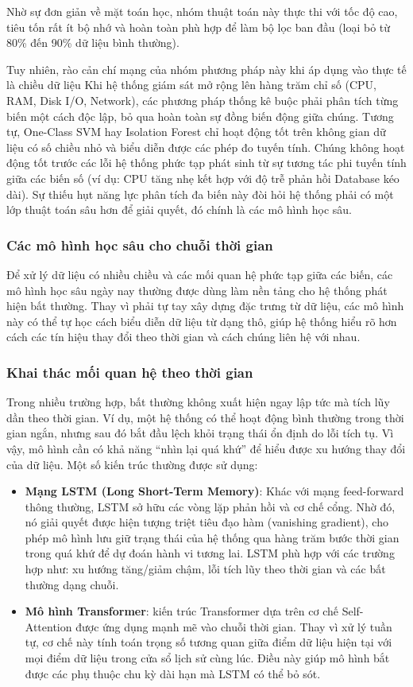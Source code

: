 Nhờ sự đơn giản về mặt toán học, nhóm thuật toán này thực thi với tốc độ cao, tiêu tốn rất ít bộ nhớ và hoàn toàn phù hợp để làm bộ lọc ban đầu (loại bỏ từ 80\% đến 90\% dữ liệu bình thường).

Tuy nhiên, rào cản chí mạng của nhóm phương pháp này khi áp dụng vào thực tế là chiều dữ liệu  Khi hệ thống giám sát mở rộng lên hàng trăm chỉ số (CPU, RAM, Disk I/O, Network), các phương pháp thống kê buộc phải phân tích từng biến một cách độc lập, bỏ qua hoàn toàn sự đồng biến động giữa chúng. Tương tự, One-Class SVM hay Isolation Forest chỉ hoạt động tốt trên không gian dữ liệu có số chiều nhỏ và biểu diễn được các phép đo tuyến tính. Chúng không hoạt động tốt trước các lỗi hệ thống phức tạp phát sinh từ sự tương tác phi tuyến tính giữa các biến số (ví dụ: CPU tăng nhẹ kết hợp với độ trễ phản hồi Database kéo dài). Sự thiếu hụt năng lực phân tích đa biến này đòi hỏi hệ thống phải có một lớp thuật toán sâu hơn để giải quyết, đó chính là các mô hình học sâu.

\subsubsection{Các mô hình học sâu cho chuỗi thời gian}
Để xử lý dữ liệu có nhiều chiều và các mối quan hệ phức tạp giữa các biến, các mô hình học sâu ngày nay thường được dùng làm nền tảng cho hệ thống phát hiện bất thường. Thay vì phải tự tay xây dựng đặc trưng từ dữ liệu, các mô hình này có thể tự học cách biểu diễn dữ liệu từ dạng thô, giúp hệ thống hiểu rõ hơn cách các tín hiệu thay đổi theo thời gian và cách chúng liên hệ với nhau.
\subsubsection*{Khai thác mối quan hệ theo thời gian}
Trong nhiều trường hợp, bất thường không xuất hiện ngay lập tức mà tích lũy dần theo thời gian. Ví dụ, một hệ thống có thể hoạt động bình thường trong thời gian ngắn, nhưng sau đó bắt đầu lệch khỏi trạng thái ổn định do lỗi tích tụ. Vì vậy, mô hình cần có khả năng “nhìn lại quá khứ” để hiểu được xu hướng thay đổi của dữ liệu.
Một số kiến trúc thường được sử dụng:
\begin{itemize}[label=--]
    \item \textbf{Mạng LSTM (Long Short-Term Memory)}: Khác với mạng feed-forward thông thường, LSTM sở hữu các vòng lặp phản hồi và cơ chế cổng. Nhờ đó, nó giải quyết được hiện tượng triệt tiêu đạo hàm (vanishing gradient), cho phép mô hình lưu giữ trạng thái của hệ thống qua hàng trăm bước thời gian trong quá khứ để dự đoán hành vi tương lai. LSTM phù hợp với các trường hợp như: xu hướng tăng/giảm chậm, lỗi tích lũy theo thời gian và các bất thường dạng chuỗi.
    \item \textbf{Mô hình Transformer}: kiến trúc Transformer dựa trên cơ chế Self-Attention được ứng dụng mạnh mẽ vào chuỗi thời gian. Thay vì xử lý tuần tự, cơ chế này tính toán trọng số tương quan giữa điểm dữ liệu hiện tại với mọi điểm dữ liệu trong cửa sổ lịch sử cùng lúc. Điều này giúp mô hình bắt được các phụ thuộc chu kỳ dài hạn mà LSTM có thể bỏ sót.
\end{itemize}

